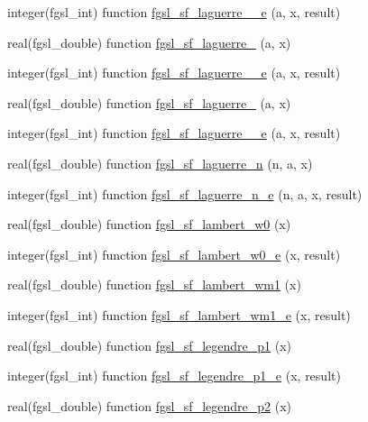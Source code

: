 \begin{DoxyCompactItemize}
integer(fgsl\+\_\+int) function \hyperlink{specfunc_8finc_a599bfb76f67c77fcfcd272e971224c3b}{fgsl\+\_\+sf\+\_\+laguerre\+\_\+\_\+e} (a, x, result)
\item 
real(fgsl\+\_\+double) function \hyperlink{specfunc_8finc_aea3ca5431913e8573dcaade93a1d5255}{fgsl\+\_\+sf\+\_\+laguerre\+\_} (a, x)
\item 
integer(fgsl\+\_\+int) function \hyperlink{specfunc_8finc_af1c3e3b6b4459d9383a9a94a8eca1f42}{fgsl\+\_\+sf\+\_\+laguerre\+\_\+\_\+e} (a, x, result)
\item 
real(fgsl\+\_\+double) function \hyperlink{specfunc_8finc_a83902835346ca0e6af9816d85f2b3c85}{fgsl\+\_\+sf\+\_\+laguerre\+\_} (a, x)
\item 
integer(fgsl\+\_\+int) function \hyperlink{specfunc_8finc_a5217c8d0228eb2c947aa79b59d677258}{fgsl\+\_\+sf\+\_\+laguerre\+\_\+\_\+e} (a, x, result)
\item 
real(fgsl\+\_\+double) function \hyperlink{specfunc_8finc_a16713f52eee01f82af0324da5f57ffa1}{fgsl\+\_\+sf\+\_\+laguerre\+\_\+n} (n, a, x)
\item 
integer(fgsl\+\_\+int) function \hyperlink{specfunc_8finc_a9768949b164412b7e758faf5c505dc1e}{fgsl\+\_\+sf\+\_\+laguerre\+\_\+n\+\_\+e} (n, a, x, result)
\item 
real(fgsl\+\_\+double) function \hyperlink{specfunc_8finc_a6aff0287bf8a1c5b0a42a6f8a1f4d46b}{fgsl\+\_\+sf\+\_\+lambert\+\_\+w0} (x)
\item 
integer(fgsl\+\_\+int) function \hyperlink{specfunc_8finc_a5b5826857aea38ebf608d399147b4cac}{fgsl\+\_\+sf\+\_\+lambert\+\_\+w0\+\_\+e} (x, result)
\item 
real(fgsl\+\_\+double) function \hyperlink{specfunc_8finc_a888c8f8f84824ad675730060333efac0}{fgsl\+\_\+sf\+\_\+lambert\+\_\+wm1} (x)
\item 
integer(fgsl\+\_\+int) function \hyperlink{specfunc_8finc_a43be02b4dffc9595930a1161342d91ee}{fgsl\+\_\+sf\+\_\+lambert\+\_\+wm1\+\_\+e} (x, result)
\item 
real(fgsl\+\_\+double) function \hyperlink{specfunc_8finc_ae078a1a7a0d1f73399c6fb75b80ac199}{fgsl\+\_\+sf\+\_\+legendre\+\_\+p1} (x)
\item 
integer(fgsl\+\_\+int) function \hyperlink{specfunc_8finc_a42d2c1164bef96a014bd173ddac852ff}{fgsl\+\_\+sf\+\_\+legendre\+\_\+p1\+\_\+e} (x, result)
\item 
real(fgsl\+\_\+double) function \hyperlink{specfunc_8finc_aed1db565bdfb41fe1d48aa49e14cf3a3}{fgsl\+\_\+sf\+\_\+legendre\+\_\+p2} (x)
\item 

\end{DoxyCompactItemize}
